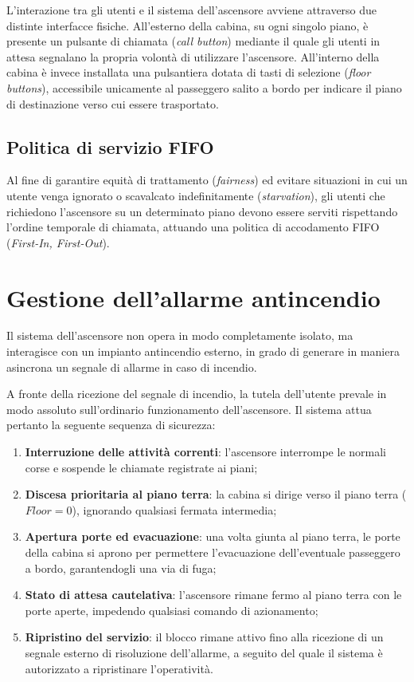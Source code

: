 L'interazione tra gli utenti e il sistema dell'ascensore avviene attraverso due distinte interfacce fisiche.
All'esterno della cabina, su ogni singolo piano, è presente un pulsante di chiamata (\emph{call button}) mediante il quale gli utenti in attesa segnalano la propria volontà di utilizzare l'ascensore.
All'interno della cabina è invece installata una pulsantiera dotata di tasti di selezione (\emph{floor buttons}), accessibile unicamente al passeggero salito a bordo per indicare il piano di destinazione verso cui essere trasportato.

\subsection{Politica di servizio FIFO}
Al fine di garantire equità di trattamento (\emph{fairness}) ed evitare situazioni in cui un utente venga ignorato o scavalcato indefinitamente (\emph{starvation}), gli utenti che richiedono l'ascensore su un determinato piano devono essere serviti rispettando l'ordine temporale di chiamata, attuando una politica di accodamento FIFO (\emph{First-In, First-Out}).

%
%
\section{Gestione dell'allarme antincendio}
\label{sec:allarme}
Il sistema dell'ascensore non opera in modo completamente isolato, ma interagisce con un impianto antincendio esterno, in grado di generare in maniera asincrona un segnale di allarme in caso di incendio.

A fronte della ricezione del segnale di incendio, la tutela dell'utente prevale in modo assoluto sull'ordinario funzionamento dell'ascensore.
Il sistema attua pertanto la seguente sequenza di sicurezza:
\begin{enumerate}
  \item \textbf{Interruzione delle attività correnti}: l'ascensore interrompe le normali corse e sospende le chiamate registrate ai piani;
  \item \textbf{Discesa prioritaria al piano terra}: la cabina si dirige verso il piano terra ($Floor = 0$), ignorando qualsiasi fermata intermedia;
  \item \textbf{Apertura porte ed evacuazione}: una volta giunta al piano terra, le porte della cabina si aprono per permettere l'evacuazione dell'eventuale passeggero a bordo, garantendogli una via di fuga;
  \item \textbf{Stato di attesa cautelativa}: l'ascensore rimane fermo al piano terra con le porte aperte, impedendo qualsiasi comando di azionamento;
  \item \textbf{Ripristino del servizio}: il blocco rimane attivo fino alla ricezione di un segnale esterno di risoluzione dell'allarme, a seguito del quale il sistema è autorizzato a ripristinare l'operatività.
\end{enumerate}

